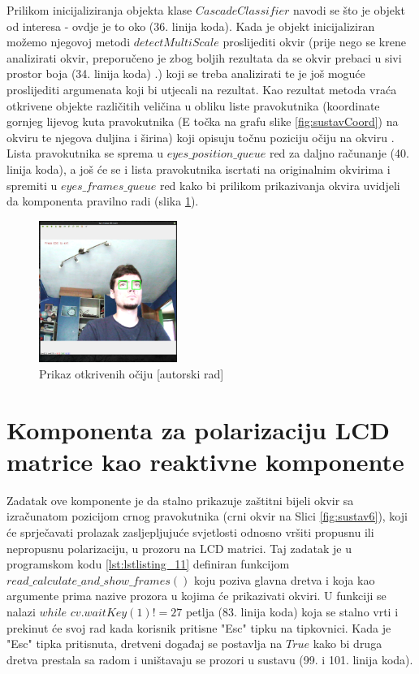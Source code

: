\documentclass{foi}
\begin{document}
Prilikom inicijaliziranja objekta klase $CascadeClassifier$ navodi se što je objekt od interesa - ovdje je to oko (36. linija koda). Kada je objekt inicijaliziran možemo njegovoj metodi $detectMultiScale$ proslijediti okvir (prije nego se krene analizirati okvir, preporučeno je zbog boljih rezultata da se okvir prebaci u sivi prostor boja (34. linija koda) \cite{OpenCV5}.) koji se treba analizirati te je još moguće proslijediti argumenata koji bi utjecali na rezultat. Kao rezultat metoda vraća otkrivene objekte različitih veličina u obliku liste pravokutnika (koordinate gornjeg lijevog kuta pravokutnika (E točka na grafu slike \ref{fig:sustavCoord}) na okviru te njegova duljina i širina) koji opisuju točnu poziciju očiju na okviru \cite{OpenCV6}. Lista pravokutnika se sprema u $eyes\_position\_queue$ red za daljno računanje (40. linija koda), a još će se i lista pravokutnika iscrtati na originalnim okvirima i spremiti u $eyes\_frames\_queue$ red kako bi prilikom prikazivanja okvira uvidjeli da komponenta pravilno radi (slika \ref{fig:sustav3}).

\begin{figure}[h!]
    \centering
    \includegraphics[width=0.4\textwidth]{slike/sustav3}
    \caption{Prikaz otkrivenih očiju [autorski rad]}
    \label{fig:sustav3}
\end{figure}

\pagebreak
\section{Komponenta za polarizaciju LCD matrice kao reaktivne komponente}

Zadatak ove komponente je da stalno prikazuje zaštitni bijeli okvir sa izračunatom pozicijom crnog pravokutnika (crni okvir na Slici \ref{fig:sustav6}), koji će sprječavati prolazak zasljepljujuće svjetlosti odnosno vršiti propusnu ili nepropusnu polarizaciju, u prozoru na LCD matrici. Taj zadatak je u programskom kodu \ref{lst:lstlisting_11} definiran funkcijom $read\_calculate\_and\_show\_frames()$ koju poziva glavna dretva i koja kao argumente prima nazive prozora u kojima će prikazivati okviri. U funkciji se nalazi $while$ $cv.waitKey(1) != 27$ petlja (83. linija koda) koja se stalno vrti i prekinut će svoj rad kada korisnik pritisne "Esc" tipku na tipkovnici. Kada je "Esc" tipka pritisnuta, dretveni događaj se postavlja na $True$ kako bi druga dretva prestala sa radom i uništavaju se prozori u sustavu (99. i 101. linija koda).
\end{document}
